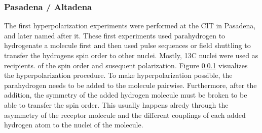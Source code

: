         \subsubsection{Pasadena / Altadena}
        The first hyperpolarization experiments were performed at the CIT in Pasadena, and later named after it. These first experiments used parahydrogen to hydrogenate a molecule first and then used pulse sequences or field shuttling to transfer the hydrogens spin order to other nuclei. Mostly, 13C nuclei were used as recipients. of the spin order and susequent polarization. Figure \ref{} visualizes the hyperpolarization procedure. To make hyperpolarization possible, the parahydrogen needs to be added to the molecule pairwise. Furthermore, after the addition, the symmetry of the added hydrogen molecule must be broken to be able to transfer the spin order. This usually happens alredy through the asymmetry of the receptor molecule and the different couplings of each added hydrogen atom to the nuclei of the molecule.
